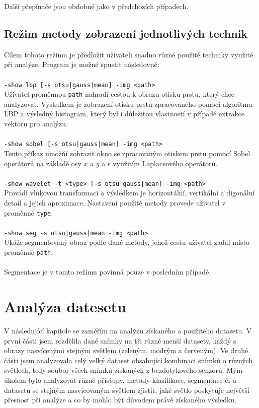 Další přepínače jsou obdobné jako v předchozích případech.

\subsection{Režim metody zobrazení jednotlivých technik}
Cílem tohoto režimu je předložit uživateli snadno různé použité techniky využité při analýze. Program je možné spustit následovně:\\\\
\verb=-show lbp [-s otsu|gauss|mean] -img <path>=\\
Uživatel proměnnou \verb=path= nahradí cestou k obrazu otisku prstu, který chce analyzovat. Výsledkem je zobrazení otisku prstu zpracovaného pomocí algoritmu LBP a výsledný histogram, který byl i důležitou vlastností v případě extrakce vektoru pro analýzu.\\\\
\verb=-show sobel [-s otsu|gauss|mean] -img <path>=\\
Tento příkaz umožňí zobrazit okno se zpracovaným otiskem prstu pomocí Sobel operátorů na základě osy $x$ a $y$ a s využitím Laplaceového operátoru.\\\\
\verb=-show wavelet -t <type> [-s otsu|gauss|mean] -img <path>=\\
Provádí vlnkovou transformaci a výsledkem je horizontální, vertikální a digonální detail a jejich aproximace. Nastavení použité metody provede uživatel v proměnné \verb=type=.\\\\
\verb=-show seg -s otsu|gauss|mean -img <path>=\\
Ukáže segmentovaný obraz podle dané metody, jehož cestu uživatel zadal místo proměnné \verb=path=.\\\\
Segmentace je v tomto režimu povinná pouze v posledním případě.







\section{Analýza datesetu}
V následující kapitole se zaměřím na analýzu získaného a použitého datasetu. V první části jsem rozdělila dané snímky na tři různé menší datasety, každý s obrazy nasvícenými stejným světlem (zeleným, modrým a červeným). Ve druhé části jsem analyzovala celý velký dataset obsahující kombinaci snímků o různých světlech, tedy soubor všech snímků získaných z bezdotykového senzoru. Mým úkolem bylo analyzovat různé přístupy, metody klasifikace, segmentace či u datasetu se stejným nasvicovaným světlem zjistit, jaké světlo poskytuje největší přesnost při analýze a co by mohlo být důvodem právě získaného výsledku.

